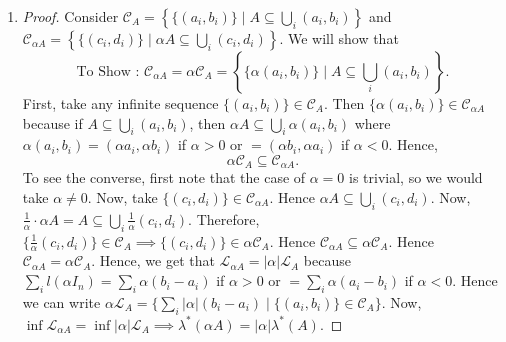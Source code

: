 \documentclass{article}
\theoremstyle{definition}
\theoremstyle{remark}
\theoremstyle{definition}
\theoremstyle{definition}
\theoremstyle{definition}
\newcommand{\abs}[1]{\left \vert #1\right \vert}
\newcommand{\union}{\cup}
\newcommand{\bunion}{\bigcup}
\newcommand{\where}{\;\vert\;}
\newcommand{\lom}[1]{\lambda^*\left (#1\right )}
\newcommand{\set}[1]{\mathscr{#1}}
\begin{document}
\begin{enumerate}
{\begin{proof}
\begin{equation*}
\begin{split}
				\lom{(a,b]} =b-a &\le \lom{(a,b) \union \bunion_{n} (b,b+\epsilon/2^n]} \\
				&\le \lom{(a,b)}  \sum_{n} b - (b+\epsilon/2^n)\\
				&= \lom{(a,b)} + \sum_n b-b -\epsilon/2^n\\
				&= \lom{(a,b)} + \sum_n \epsilon/2^n\\
				&= \lom{(a,b)}.
			\end{split}
		\end{equation*}
	Hence, $ l((a,b)) = \lom{(a,b)} = b-a $. Hence, one can take interval $ \{(a_n,b_n)\} $ as the sequence of intervals in the definition of Lebesgue Outer Measure as well, instead of $ \{(a_n,b_n]\} $.
\end{proof}}
\item {\begin{proof}
		Consider $ \set{C}_A = \left \{\{(a_i,b_i)\}\where A \subseteq \bunion_i(a_i,b_i)\right \} $ and $ \set{C}_{\alpha A} = \left \{ \{(c_i,d_i)\}\where \alpha A \subseteq  \bunion_i (c_i,d_i) \right \} $. We will show that 
		\[\text{To Show : }\set{C}_{\alpha A} = \alpha \set{C}_{A} = \left \{\{\alpha(a_i,b_i)\} \where A \subseteq \bunion_i(a_i,b_i)\right \}.\]
		First, take any infinite sequence $ \{(a_i,b_i)\}\in \set{C}_A $. Then $ \{\alpha(a_i,b_i)\} \in \set{C}_{\alpha A} $ because if $ A \subseteq \bunion_i (a_i,b_i) $, then $ \alpha A \subseteq \bunion_i \alpha(a_i,b_i) $ where $ \alpha(a_i,b_i) = (\alpha a_i,\alpha b_i) $ if $ \alpha > 0 $ or $ = (\alpha b_i, \alpha a_i) $ if $ \alpha <0 $. Hence, 
		\[ \alpha \set{C}_A \subseteq \set{C}_{\alpha A}. \]
		To see the converse, first note that the case of $ \alpha = 0 $ is trivial, so we would take $ \alpha \neq 0 $. Now, take $ \{(c_i,d_i)\}\in \set{C}_{\alpha A} $. Hence $ \alpha A \subseteq \bunion_i (c_i,d_i)  $. Now, $ \frac{1}{\alpha} \cdot \alpha A = A \subseteq \bunion_i \frac{1}{\alpha}\left (c_i,d_i\right ) $. Therefore, $ \{\frac{1}{\alpha}(c_i,d_i)\} \in \set{C}_A \implies \{(c_i,d_i)\} \in \alpha \set{C}_A$. Hence $ \set{C}_{\alpha A} \subseteq \alpha \set{C}_A $. Hence $ \set{C}_{\alpha A} = \alpha\set{C}_A $. Hence, we get that $ \set{L}_{\alpha A} = \abs{\alpha}\set{L}_A $ because $ \sum_i l(\alpha I_n) = \sum_{i} \alpha(b_i-a_i)$ if $ \alpha > 0$ or $ = \sum_i \alpha(a_i-b_i) $ if $ \alpha<0 $. Hence we can write $ \alpha\set{L}_A = \{ \sum_i \abs{\alpha}(b_i - a_i)\where \{(a_i,b_i)\} \in \set{C}_A  \} $. Now, $ \inf \set{L}_{\alpha A} = \inf \abs{\alpha} \set{L}_A \implies \lom{\alpha A} = \abs{\alpha} \lom{A}$.
\end{proof}}

\end{enumerate}
\end{document}
